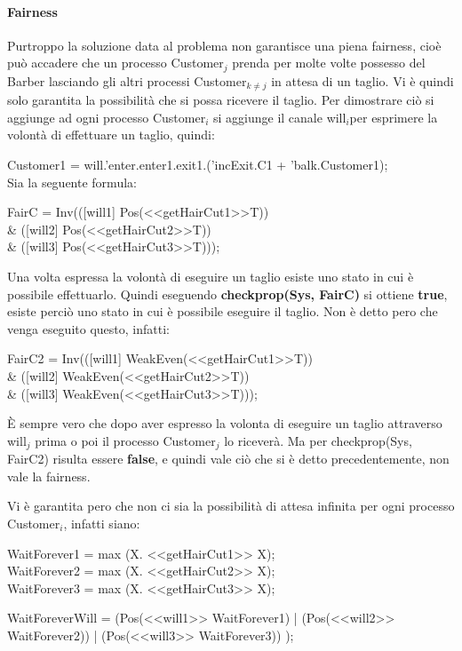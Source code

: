 \paragraph{Fairness}\mbox{}

Purtroppo la soluzione data al problema non garantisce una piena fairness, cioè può accadere che un processo \textsf{Customer$_{j}$} prenda per molte volte possesso del \textsf{Barber} lasciando gli altri processi \textsf{Customer$_{k\not=j}$} in attesa di un taglio. Vi è quindi solo garantita la possibilità che si possa ricevere il taglio.
Per dimostrare ciò si aggiunge ad ogni processo \textsf{Customer$_{i}$} si aggiunge il canale \textsf{will$_{i}$}per esprimere la volontà di effettuare un taglio, quindi:

\textsf{Customer1 = will.'enter.enter1.exit1.('incExit.C1 + 'balk.Customer1);}\\

Sia la seguente formula:

\begin{center}
	\textsf{FairC = Inv(([will1] Pos(<<getHairCut1>>T)) \\\& ([will2] Pos(<<getHairCut2>>T)) \\\& ([will3] Pos(<<getHairCut3>>T))); }
\end{center}

Una volta espressa la volontà di eseguire un taglio esiste uno stato in cui è possibile effettuarlo. Quindi eseguendo \textbf{checkprop(Sys, FairC)} si ottiene \textbf{true}, esiste perciò uno stato in cui è possibile eseguire il taglio. Non è detto pero che venga eseguito questo, infatti:

\begin{center}
	\textsf{FairC2 = Inv(([will1] WeakEven(<<getHairCut1>>T)) \\\& ([will2] WeakEven(<<getHairCut2>>T)) \\\& ([will3] WeakEven(<<getHairCut3>>T)));}
\end{center}

È sempre vero che dopo aver espresso la volonta di eseguire un taglio attraverso \textsf{will$_{j}$} prima o poi il processo \textsf{Customer$_{j}$} lo riceverà. Ma per checkprop(Sys, FairC2) risulta essere \textbf{false}, e quindi vale ciò che si è detto precedentemente, non vale la fairness.

Vi è garantita pero che non ci sia la possibilità di attesa infinita per ogni processo \textsf{Customer$_{i}$}, infatti siano:
\begin{center}
\textsf{WaitForever1 = max (X. <<getHairCut1>> X);}\\
\textsf{WaitForever2 = max (X. <<getHairCut2>> X);}\\
\textsf{WaitForever3 = max (X. <<getHairCut3>> X);}\\\mbox{}


\textsf{WaitForeverWill = (Pos(<<will1>> WaitForever1) | (Pos(<<will2>> WaitForever2)) | (Pos(<<will3>> WaitForever3)) );}
\end{center}

